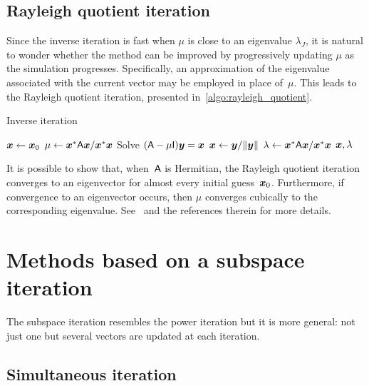 \subsection{Rayleigh quotient iteration}
Since the inverse iteration is fast when $\mu$ is close to an eigenvalue $\lambda_J$,
it is natural to wonder whether the method can be improved by progressively updating $\mu$ as the simulation progresses.
Specifically, an approximation of the eigenvalue associated with the current vector may be employed in place of~$\mu$.
This leads to the Rayleigh quotient iteration,
presented in~\cref{algo:rayleigh_quotient}.
\begin{algorithm}
\caption{Inverse iteration}%
\label{algo:rayleigh_quotient}%
\begin{algorithmic}
\State $\mathbf{\boldsymbol{x}} \gets \mathbf{\boldsymbol{x}}_0$
    \State $\mu \gets \mathbf{\boldsymbol{x}}^* \mathsf A \mathbf{\boldsymbol{x}} / \mathbf{\boldsymbol{x}}^* \mathbf{\boldsymbol{x}}$
    \State Solve $(\mathsf A - \mu \mathsf I) \mathbf{\boldsymbol{y}} = \mathbf{\boldsymbol{x}}$
    \State $\mathbf{\boldsymbol{x}} \gets \mathbf{\boldsymbol{y}} / \lVert\mathbf{\boldsymbol{y}}\rVert$
\EndFor
\State $\lambda \gets \mathbf{\boldsymbol{x}}^* \mathsf A \mathbf{\boldsymbol{x}} / \mathbf{\boldsymbol{x}}^* \mathbf{\boldsymbol{x}}$
\State \Return $\mathbf{\boldsymbol{x}}, \lambda$
\end{algorithmic}
\end{algorithm}

It is possible to show that, when~$\mathsf A$ is Hermitian,
the Rayleigh quotient iteration converges to an eigenvector for almost every initial guess~$\mathbf{\boldsymbol{x}}_0$.
Furthermore, if convergence to an eigenvector occurs,
then $\mu$ converges cubically to the corresponding eigenvalue.
See~\cite{MR3396212} and the references therein for more details.

\section{Methods based on a subspace iteration}
\label{sec:subspace_iteration}
The subspace iteration resembles the power iteration but it is more general:
not just one but several vectors are updated at each iteration.

\subsection{Simultaneous iteration}
\label{sub:simultaneous_iteration}

